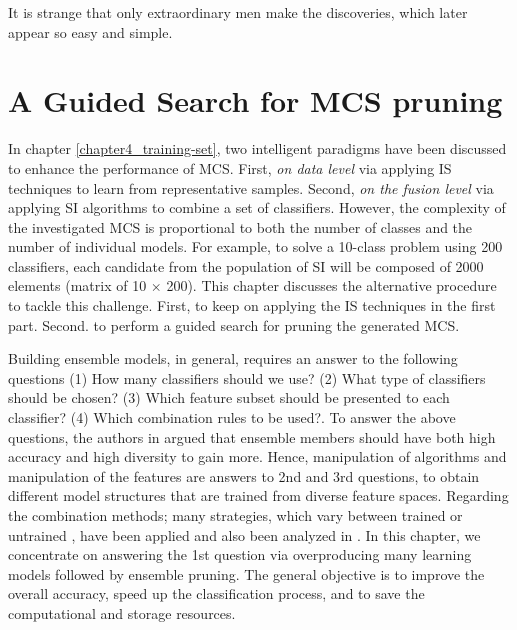 



\begin{savequote}[50mm]
It is strange that only extraordinary men make the discoveries, which later appear so easy and simple.
\end{savequote}


\chapter{A Guided Search for MCS pruning}
\label{ch5_GUided_MCS_Pruning}

In chapter \ref{chapter4_training-set}, two intelligent paradigms have been discussed to enhance the performance of MCS. First, \textit{on data level} via applying IS techniques to learn from representative samples. Second, \textit{on the fusion level} via applying SI algorithms to combine a set of classifiers. However, the complexity of the investigated MCS is proportional to both the number of classes and the number of individual models. For example, to solve a 10-class problem using 200 classifiers, each candidate from the population of SI will be composed of 2000 elements (matrix of 10 $\times$ 200). This chapter discusses the alternative procedure to tackle this challenge. First, to keep on applying the IS techniques in the first part. Second. to perform a guided search for pruning the generated MCS. 

Building ensemble models, in general, requires an answer to the following questions \cite{xu1992} (1) How many classifiers should we use? (2) What type of classifiers should be chosen? (3) Which feature subset should be presented to each classifier? (4) Which combination rules to be used?. To answer the above questions, the authors in \cite{kuncheva2003,dietterich2000}  argued that ensemble members should have both high accuracy and high diversity to gain more. Hence, manipulation of algorithms \cite{sesmero2015} and manipulation of the features \cite{rodriguez2006}  are answers to 2nd and 3rd questions, to obtain different model structures that are trained from diverse feature spaces. Regarding the combination methods; many strategies, which vary between trained \cite{sesmero2015,wozniak2010} or untrained \cite{krawczyk2016,kuncheva2014}, have been applied and also been analyzed in  \cite{kuncheva2014a}. In this chapter, we concentrate on answering the 1st question via overproducing many learning models followed by ensemble pruning. The general objective is to improve the overall accuracy, speed up the classification process, and to save the computational and storage resources.


